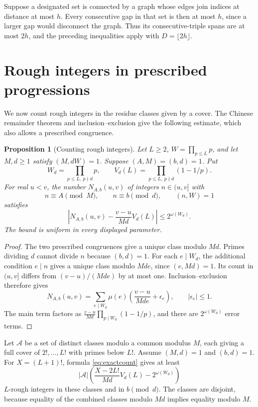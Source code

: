 \documentclass[11pt]{amsart}
\newtheorem{proposition}[theorem]{Proposition}
\theoremstyle{definition}
\theoremstyle{remark}
\begin{document}
Suppose a designated set is connected by a graph whose edges join
indices at distance at most $h$. Every consecutive gap in that set is
then at most $h$, since a larger gap would disconnect the graph. Thus its
consecutive-triple spans are at most $2h$, and the preceding inequalities
apply with $D=\lfloor2h\rfloor$.
\section{Rough integers in prescribed progressions}\label{sec:arithmetic}

We now count rough integers in the residue classes given by a cover.
The Chinese remainder theorem and inclusion--exclusion give the
following estimate, which also allows a prescribed congruence.

\begin{proposition}[Counting rough integers]\label{prop:counting}
Let $L\geq2$, $W=\prod_{p\leq L}p$, and let $M,d\geq1$ satisfy
$(M,dW)=1$. Suppose $(A,M)=(b,d)=1$. Put
\[
W_d=\prod_{p\leq L,\ p\nmid d}p,
\qquad V_d(L)=\prod_{p\leq L,\ p\nmid d}(1-1/p).
\]
For real $u<v$, the number $N_{A,b}(u,v)$ of integers $n\in(u,v]$ with
\[
n\equiv A\pmod M,\qquad n\equiv b\pmod d,
\qquad(n,W)=1
\]
satisfies
\begin{equation}\label{eq:exactcount}
\left|N_{A,b}(u,v)-\frac{v-u}{Md}V_d(L)\right|
\leq2^{\omega(W_d)}.
\end{equation}
The bound is uniform in every displayed parameter.
\end{proposition}
\begin{proof}
The two prescribed congruences give a unique class modulo $Md$.
Primes dividing $d$ cannot divide $n$ because $(b,d)=1$.
For each $e\mid W_d$, the additional condition $e\mid n$ gives a unique
class modulo $Mde$, since $(e,Md)=1$. Its count in $(u,v]$ differs from
$(v-u)/(Mde)$ by at most one. Inclusion--exclusion therefore gives
\[
N_{A,b}(u,v)=\sum_{e\mid W_d}\mu(e)
\left(\frac{v-u}{Mde}+\epsilon_e\right),\qquad |\epsilon_e|\leq1.
\]
The main term factors as $\frac{v-u}{Md}\prod_{p\mid W_d}(1-1/p)$,
and there are $2^{\omega(W_d)}$ error terms.
\end{proof}

Let $\mathcal A$ be a set of distinct classes modulo a common modulus
$M$, each giving a full cover of $2!,\ldots,L!$ with primes below $L!$.
Assume $(M,d)=1$ and $(b,d)=1$. For $X=(L+1)!$, formula
\eqref{eq:exactcount} gives at least
\begin{equation}\label{eq:ensembletransference}
|\mathcal A|\left(
\frac{X-2L!}{Md}V_d(L)-2^{\omega(W_d)}
\right)
\end{equation}
$L$-rough integers in these classes and in $b\pmod d$.
The classes are disjoint, because equality of the combined classes
modulo $Md$ implies equality modulo $M$.
\end{document}
